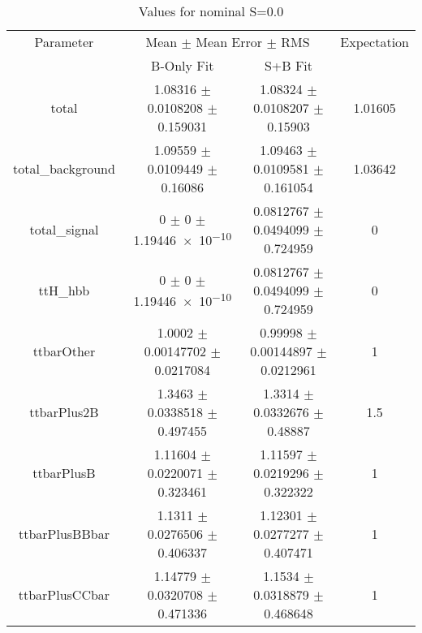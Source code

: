 \begin{table}
\centering
\caption{Values for nominal S=0.0}
\begin{tabular}{cccc}
\toprule
Parameter & \multicolumn{2}{c}{Mean $\pm$ Mean Error $\pm$ RMS} & Expectation\\
 & B-Only Fit & S+B Fit & \\
\midrule
total & \num{1.08316} $\pm$ \num{0.0108208} $\pm$ \num{0.159031} & \num{1.08324} $\pm$ \num{0.0108207} $\pm$ \num{0.15903} & \num{1.01605}\\
total\_background & \num{1.09559} $\pm$ \num{0.0109449} $\pm$ \num{0.16086} & \num{1.09463} $\pm$ \num{0.0109581} $\pm$ \num{0.161054} & \num{1.03642}\\
total\_signal & \num{0} $\pm$ \num{0} $\pm$ \num{1.19446e-10} & \num{0.0812767} $\pm$ \num{0.0494099} $\pm$ \num{0.724959} & \num{0}\\
ttH\_hbb & \num{0} $\pm$ \num{0} $\pm$ \num{1.19446e-10} & \num{0.0812767} $\pm$ \num{0.0494099} $\pm$ \num{0.724959} & \num{0}\\
ttbarOther & \num{1.0002} $\pm$ \num{0.00147702} $\pm$ \num{0.0217084} & \num{0.99998} $\pm$ \num{0.00144897} $\pm$ \num{0.0212961} & \num{1}\\
ttbarPlus2B & \num{1.3463} $\pm$ \num{0.0338518} $\pm$ \num{0.497455} & \num{1.3314} $\pm$ \num{0.0332676} $\pm$ \num{0.48887} & \num{1.5}\\
ttbarPlusB & \num{1.11604} $\pm$ \num{0.0220071} $\pm$ \num{0.323461} & \num{1.11597} $\pm$ \num{0.0219296} $\pm$ \num{0.322322} & \num{1}\\
ttbarPlusBBbar & \num{1.1311} $\pm$ \num{0.0276506} $\pm$ \num{0.406337} & \num{1.12301} $\pm$ \num{0.0277277} $\pm$ \num{0.407471} & \num{1}\\
ttbarPlusCCbar & \num{1.14779} $\pm$ \num{0.0320708} $\pm$ \num{0.471336} & \num{1.1534} $\pm$ \num{0.0318879} $\pm$ \num{0.468648} & \num{1}\\
\bottomrule
\end{tabular}
\end{table}